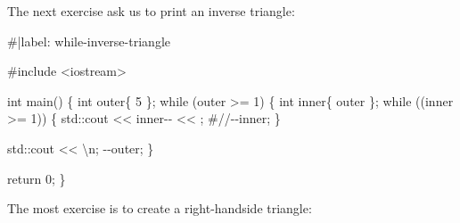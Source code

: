 \documentclass[
  letterpaper,
  DIV=11,
  numbers=noendperiod]{scrreprt}
\newenvironment{Shaded}{\begin{snugshade}}{\end{snugshade}}
\newcommand{\CommentTok}[1]{\textcolor[rgb]{0.37,0.37,0.37}{#1}}
\newcommand{\ControlFlowTok}[1]{\textcolor[rgb]{0.00,0.23,0.31}{#1}}
\newcommand{\DecValTok}[1]{\textcolor[rgb]{0.68,0.00,0.00}{#1}}
\newcommand{\ErrorTok}[1]{\textcolor[rgb]{0.68,0.00,0.00}{#1}}
\newcommand{\FunctionTok}[1]{\textcolor[rgb]{0.28,0.35,0.67}{#1}}
\newcommand{\NormalTok}[1]{\textcolor[rgb]{0.00,0.23,0.31}{#1}}
\newcommand{\SpecialCharTok}[1]{\textcolor[rgb]{0.37,0.37,0.37}{#1}}
\newcommand{\StringTok}[1]{\textcolor[rgb]{0.13,0.47,0.30}{#1}}
\begin{document}
The next exercise ask us to print an inverse triangle:

\begin{Shaded}
\begin{Highlighting}[]
\CommentTok{\#|label: while{-}inverse{-}triangle}

\CommentTok{\#include \textless{}iostream\textgreater{}}

\NormalTok{int }\FunctionTok{main}\NormalTok{()}
\NormalTok{\{}
\NormalTok{    int outer\{ }\DecValTok{5}\NormalTok{ \};}
    \ControlFlowTok{while}\NormalTok{ (outer }\SpecialCharTok{\textgreater{}=} \DecValTok{1}\NormalTok{)}
\NormalTok{    \{}
\NormalTok{        int inner\{ outer \};}
        \ControlFlowTok{while}\NormalTok{ ((inner }\SpecialCharTok{\textgreater{}=} \DecValTok{1}\NormalTok{))}
\NormalTok{        \{}
\NormalTok{            std}\SpecialCharTok{::}\NormalTok{cout }\SpecialCharTok{\textless{}}\ErrorTok{\textless{}}\NormalTok{ inner}\SpecialCharTok{{-}{-}} \ErrorTok{\textless{}\textless{}} \StringTok{\textquotesingle{} \textquotesingle{}}\NormalTok{;}
            \CommentTok{\#//{-}{-}inner;}
\NormalTok{        \}}

\NormalTok{        std}\SpecialCharTok{::}\NormalTok{cout }\SpecialCharTok{\textless{}}\ErrorTok{\textless{}} \StringTok{\textquotesingle{}}\SpecialCharTok{\textbackslash{}n}\StringTok{\textquotesingle{}}\NormalTok{;}
        \SpecialCharTok{{-}{-}}\NormalTok{outer;}
\NormalTok{    \}}

\NormalTok{    return }\DecValTok{0}\NormalTok{;}
\NormalTok{\}}
\end{Highlighting}
\end{Shaded}

The most exercise is to create a right-handside triangle:
\end{document}

